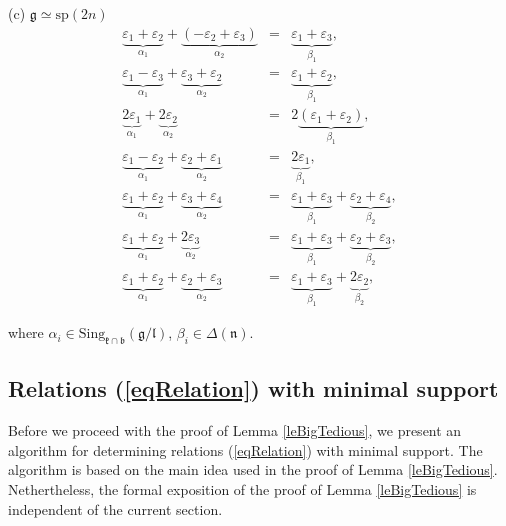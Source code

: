 \documentclass[12pt]{report}
\newcommand{\kk}{\mathfrak{k}}
\newcommand{\nn}{\mathfrak{n}}
\newcommand{\gG}{\mathfrak{g}}
\newcommand{\bb}{\mathfrak{b}}
\newcommand{\lL}{\mathfrak{l}}
\newcommand{\refeq}[1]{(\ref{#1})}
\newcommand{\sP}{\mathrm{sp}}
\newcommand{\hw}{\mathrm{Sing}}
\newcommand{\eps}{\varepsilon}
\begin{document}
\smallskip \noindent (c) $\gG\simeq\sP(2n)$
\begin{eqnarray}
\underbrace{\eps_{1}+\eps_{2}}_{\alpha_1}+\underbrace{(- \eps_{2}+\eps_{3})}_{\alpha_2} &=& \underbrace{ \eps_{1} + \eps_{3}}_{\beta_1}, \label{eqRelsp(2n)TypeA2}\\
\label{eqRelsp(2n)Type1}
\underbrace{\eps_{1}-\eps_{3}}_{\alpha_1} +\underbrace{\eps_{3}+\eps_{2}}_{\alpha_2} &=&\underbrace{\eps_{1}+\eps_{2}}_{\beta_1},\\
\label{eqRelsp(2n)Type4}
\underbrace{2\eps_{1}}_{\alpha_1}+\underbrace{ 2\eps_{2}}_{\alpha_2} &=& 2\underbrace{(\eps_{1}+\eps_{2})}_{\beta_{1}},\\
\label{eqRelsp(2n)Type1'}
\underbrace{\eps_{1}-\eps_{2}}_{\alpha_1} +\underbrace{\eps_{2}+\eps_{1}}_{\alpha_2} &=&\underbrace{2\eps_{1}}_{\beta_1},\\
\label{eqRelsp(2n)Type2}
\underbrace{\eps_{1}+\eps_{2}}_{\alpha_1}+\underbrace{\eps_{3}+\eps_{4}}_{\alpha_2}&=& \underbrace{\eps_{1}+ \eps_{3}}_{\beta_{1}}+\underbrace{ \eps_{2}+ \eps_{4}}_{\beta_{2}},\\
\label{eqRelsp(2n)Type3} 
\underbrace{\eps_{1}+\eps_{2}}_{\alpha_1}+\underbrace{ 2\eps_{3}}_{\alpha_2}&=& \underbrace{\eps_{1}+ \eps_{3}}_{\beta_{1}}+\underbrace{\eps_{2}+\eps_{3}}_{\beta_{2}},\\
\label{eqRelsp(2n)Type3'} 
\underbrace{\eps_{1}+\eps_{2}}_{\alpha_1}+\underbrace{ \eps_{2}+ \eps_{3}}_{\alpha_2}&=& \underbrace{\eps_{1}+  \eps_{3}}_{\beta_{1}}+ \underbrace{ 2\eps_{2}}_{\beta_{2}},
\end{eqnarray}

\noindent where $\alpha_{i}\in \hw_{\kk\cap\bb}(\gG/\lL)$, $\beta_i\in \Delta(\nn)$.

\subsection{Relations \refeq{eqRelation} with minimal support}\label{secAlgoMinRel}
Before we proceed with the proof of Lemma \ref{leBigTedious}, we present an algorithm for determining relations (\ref{eqRelation}) with minimal support. The algorithm is based on the main idea used in the proof of Lemma \ref{leBigTedious}. Nethertheless, the formal exposition of the proof of Lemma \ref{leBigTedious} is independent of the current section.
\end{document}
